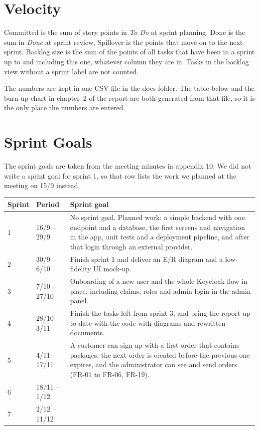 \documentclass[a4paper,11pt]{article}
\begin{document}
\section*{Velocity}
Committed is the sum of story points in \emph{To Do} at sprint planning. Done is the sum in \emph{Done} at sprint review. Spillover is the points that move on to the next sprint. Backlog size is the sum of the points of all tasks that have been in a sprint up to and including this one, whatever column they are in. Tasks in the backlog view without a sprint label are not counted.

The numbers are kept in one CSV file in the docs folder. The table below and the burn-up chart in chapter~2 of the report are both generated from that file, so it is the only place the numbers are entered.

\begin{center}
\end{center}

\section*{Sprint Goals}
The sprint goals are taken from the meeting minutes in appendix 10. We did not write a sprint goal for sprint 1, so that row lists the work we planned at the meeting on 15/9 instead.

\begin{center}
\begin{tabular}{@{}llp{9cm}@{}}
Sprint & Period & Sprint goal \\ \hline
1 & 16/9 -- 29/9 & No sprint goal. Planned work: a simple backend with one endpoint and a database, the first screens and navigation in the app, unit tests and a deployment pipeline, and after that login through an external provider. \\
2 & 30/9 -- 6/10 & Finish sprint 1 and deliver an E/R diagram and a low-fidelity UI mock-up. \\
3 & 7/10 -- 27/10 & Onboarding of a new user and the whole Keycloak flow in place, including claims, roles and admin login in the admin panel. \\
4 & 28/10 -- 3/11 & Finish the tasks left from sprint 3, and bring the report up to date with the code with diagrams and rewritten documents. \\
5 & 4/11 -- 17/11 & A customer can sign up with a first order that contains packages, the next order is created before the previous one expires, and the administrator can see and send orders (FR-01 to FR-06, FR-19). \\
6 & 18/11 -- 1/12 & \\
7 & 2/12 -- 11/12 & \\
\end{tabular}
\end{center}

\printbibliography
\end{document}
